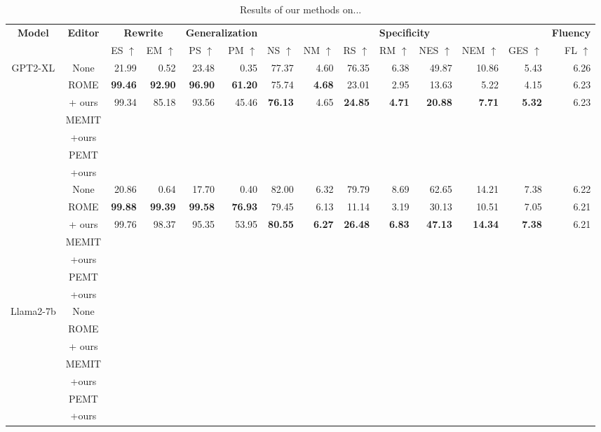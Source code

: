 \addtolength{\tabcolsep}{2pt}

\begin{table*}[!htbp]
    \centering
    \tiny
    \caption{Results of our methods on...}
    \label{tab:main}
    \begin{adjustbox}{width=1\textwidth}
    \begin{tabular}{ccrrrrrrrrrrrr}
    \toprule
         \multicolumn{1}{c}{\textbf{Model}}&\multicolumn{1}{c}{\textbf{Editor}} & \multicolumn{2}{c}{\textbf{Rewrite}} & \multicolumn{2}{c}{\textbf{Generalization}} & \multicolumn{7}{c}{\textbf{Specificity}} & \multicolumn{1}{c}{\textbf{Fluency}} \\
        \cmidrule(lr){3-4}\cmidrule(lr){5-6}\cmidrule(lr){7-13}\cmidrule(lr){14-14}
        && ES $\uparrow$ & EM $\uparrow$ & PS $\uparrow$ & PM $\uparrow$ & NS $\uparrow$ & NM $\uparrow$ & RS $\uparrow$ & RM $\uparrow$ & NES $\uparrow$ & NEM $\uparrow$ & GES $\uparrow$ & FL $\uparrow$\\
        \midrule
    \multirow{8}{*}{GPT2-XL} 
    &None&21.99& 0.52 & 23.48&0.35 & 77.37 &4.60 & 76.35 &6.38 & 49.87& 10.86 & 5.43 & 6.26  \\
    \cmidrule(lr){2-14}
    &ROME& \bf 99.46 & \bf 92.90 & \bf 96.90 & \bf 61.20 & 75.74&\bf 4.68 & 23.01 &2.95 & 13.63 & 5.22 & 4.15 & 6.23    \\
    &+ ours& 99.34 & 85.18 & 93.56 & 45.46 & \bf 76.13 & 4.65 & \bf 24.85 & \bf 4.71 & \bf 20.88 & \bf 7.71 & \bf 5.32 & 6.23 \\
    \cmidrule(lr){2-14}
    & MEMIT \\
    & +ours \\
    \cmidrule(lr){2-14}
    & PEMT \\
    & +ours \\
    \cmidrule(lr){1-14}
    \multirow{8}{*}{GPT-J} 
    &None&20.86&0.64 & 17.70&0.40 &82.00 &6.32 & 79.79&8.69 & 62.65& 14.21 & 7.38 & 6.22  \\
    \cmidrule(lr){2-14}
    &ROME& \bf99.88 & \bf99.39 & \bf99.58 & \bf76.93& 79.45&6.13 & 11.14&3.19 & 30.13& 10.51 &7.05 & 6.21  \\
    &+ ours&99.76&98.37 & 95.35& 53.95& \bf80.55& \bf6.27& \bf26.48& \bf6.83& \bf47.13& \bf14.34 &\bf7.38 & 6.21  \\
    \cmidrule(lr){2-14}
    & MEMIT \\
    & +ours \\
    \cmidrule(lr){2-14}
    & PEMT \\
    & +ours \\
    \cmidrule(lr){1-14}
    \multirow{8}{*}{Llama2-7b} 
    &None  \\
    \cmidrule(lr){2-14}
    &ROME  \\
    &+ ours  \\
    \cmidrule(lr){2-14}
    & MEMIT \\
    & +ours \\
    \cmidrule(lr){2-14}
    & PEMT \\
    & +ours \\
    \bottomrule
    \end{tabular}
    \end{adjustbox}
\end{table*}%

\addtolength{\tabcolsep}{-2pt}